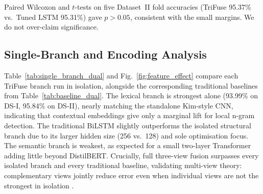 \documentclass[10pt,twocolumn,a4paper]{article}
\begin{document}
Paired Wilcoxon and $t$-tests on five Dataset~II fold accuracies (TriFuse 95.37\% vs.\ Tuned LSTM 95.31\%) gave $p>0.05$, consistent with the small margins. We do not over-claim significance.

\subsection{Single-Branch and Encoding Analysis}\label{subsec:single_branch}

Table~\ref{tab:single_branch_dual} and Fig.~\ref{fig:feature_effect} compare each TriFuse branch run in isolation, alongside the corresponding traditional baselines from Table~\ref{tab:baseline_dual}. The lexical branch is strongest alone (93.99\% on DS-I, 95.84\% on DS-II), nearly matching the standalone Kim-style CNN, indicating that contextual embeddings give only a marginal lift for local n-gram detection. The traditional BiLSTM slightly outperforms the isolated structural branch due to its larger hidden size (256 vs.\ 128) and sole optimisation focus. The semantic branch is weakest, as expected for a small two-layer Transformer adding little beyond DistilBERT. Crucially, full three-view fusion surpasses every isolated branch and every traditional baseline, validating multi-view theory: complementary views jointly reduce error even when individual views are not the strongest in isolation \citep{ref19}.

\begin{table}[!t]
\caption{Single-branch performance (\%).}
\label{tab:single_branch_dual}
\centering
{}
\end{table}
\end{document}
